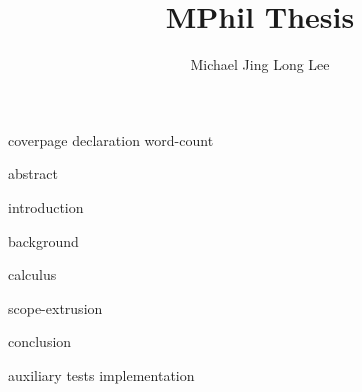 \documentclass[12pt,a4paper,twoside,openany,BCOR=2cm]{scrbook}
\title{MPhil Thesis}
\author{Michael Jing Long Lee}
\begin{document}


\frontmatter
{
  {coverpage}
  {declaration}
  {word-count}


{abstract}

\hypersetup{linkcolor=black, linkbordercolor=white}
\tableofcontents

 }

\mainmatter
{introduction}

{background}

{calculus}

{scope-extrusion}


{conclusion}



\appendix

{auxiliary}
{tests}
{implementation}
\end{document}
